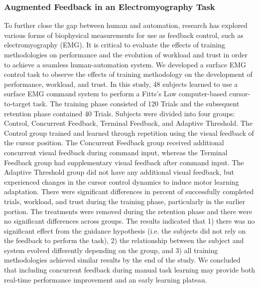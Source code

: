 \subsubsection{Augmented Feedback in an Electromyography Task}
To further close the gap between human and automation, research has explored various forms of biophysical measurements for use as feedback control, such as electromyography (EMG).
It is critical to evaluate the effects of training methodologies on performance and the evolution of workload and trust in order to achieve a seamless human-automation system.
We developed a surface EMG control task to observe the effects of training methodology on the development of performance, workload, and trust.
In this study, 48 subjects learned to use a surface EMG command system to perform a Fitts's Law computer-based cursor-to-target task.
The training phase consisted of 120 Trials and the subsequent retention phase contained 40 Trials.
Subjects were divided into four groups: Control, Concurrent Feedback, Terminal Feedback, and Adaptive Threshold.
The Control group trained and learned through repetition using the visual feedback of the cursor position.
The Concurrent Feedback group received additional concurrent visual feedback during command input, whereas the Terminal Feedback group had supplementary visual feedback after command input.
The Adaptive Threshold group did not have any additional visual feedback, but experienced changes in the cursor control dynamics to induce motor learning adaptation.
There were significant differences in percent of successfully completed trials, workload, and trust during the training phase, particularly in the earlier portion.
The treatments were removed during the retention phase and there were no significant differences across groups.
The results indicated that 1) there was no significant effect from the guidance hypothesis (i.e. the subjects did not rely on the feedback to perform the task), 2) the relationship between the subject and system evolved differently depending on the group, and 3) all training methodologies achieved similar results by the end of the study.
We concluded that including concurrent feedback during manual task learning may provide both real-time performance improvement and an early learning plateau.

